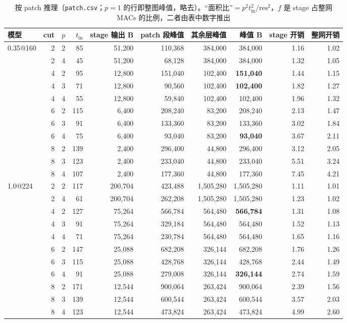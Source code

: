 \documentclass[11pt,a4paper]{ctexart}
\begin{document}
\begin{table}[H]
\centering\small
\caption{按 patch 推理（\texttt{patch.csv}；$p=1$ 的行即整图峰值，略去）。“面积比”$=p^2 t_\text{in}^2/\text{res}^2$，$f$ 是 stage 占整网 MACs 的比例，二者由表中数字推出}\label{tab:patch}
\setlength{\tabcolsep}{4pt}
\begin{tabular}{lrrrrrrrrr}
\toprule
模型 & cut & $p$ & $t_\text{in}$ & stage 输出 B & patch 段峰值 & 其余层峰值 & \textbf{峰值} B & stage 开销 & 整网开销 \\
\midrule
0.35@160 & 2 & 2 & 85 & 51,200 & 110,368 & 384,000 & 384,000 & 1.16 & 1.02 \\
 & 2 & 4 & 45 & 51,200 & 68,128 & 384,000 & 384,000 & 1.32 & 1.05 \\
 & 4 & 2 & 95 & 12,800 & 151,040 & 102,400 & \textbf{151,040} & 1.44 & 1.15 \\
 & 4 & 3 & 71 & 12,800 & 90,560 & 102,400 & \textbf{102,400} & 1.82 & 1.27 \\
 & 4 & 4 & 55 & 12,800 & 59,840 & 102,400 & 102,400 & 1.96 & 1.32 \\
 & 6 & 2 & 115 & 6,400 & 208,240 & 83,200 & 208,240 & 2.13 & 1.47 \\
 & 6 & 3 & 91 & 6,400 & 133,360 & 83,200 & 133,360 & 3.02 & 1.84 \\
 & 6 & 4 & 75 & 6,400 & 93,040 & 83,200 & \textbf{93,040} & 3.67 & 2.11 \\
 & 8 & 2 & 139 & 2,400 & 296,400 & 44,800 & 296,400 & 3.12 & 2.05 \\
 & 8 & 3 & 123 & 2,400 & 233,040 & 44,800 & 233,040 & 5.51 & 3.24 \\
 & 8 & 4 & 107 & 2,400 & 177,360 & 44,800 & 177,360 & 7.45 & 4.21 \\
\midrule
1.0@224 & 2 & 2 & 117 & 200,704 & 423,488 & 1,505,280 & 1,505,280 & 1.11 & 1.01 \\
 & 2 & 4 & 61 & 200,704 & 262,208 & 1,505,280 & 1,505,280 & 1.23 & 1.02 \\
 & 4 & 2 & 127 & 75,264 & 566,784 & 564,480 & \textbf{566,784} & 1.31 & 1.08 \\
 & 4 & 3 & 91 & 75,264 & 329,184 & 564,480 & 564,480 & 1.52 & 1.13 \\
 & 4 & 4 & 71 & 75,264 & 230,784 & 564,480 & 564,480 & 1.65 & 1.16 \\
 & 6 & 2 & 147 & 25,088 & 682,208 & 326,144 & 682,208 & 1.76 & 1.26 \\
 & 6 & 3 & 115 & 25,088 & 428,768 & 326,144 & 428,768 & 2.44 & 1.49 \\
 & 6 & 4 & 91 & 25,088 & 279,008 & 326,144 & \textbf{326,144} & 2.74 & 1.59 \\
 & 8 & 2 & 171 & 12,544 & 900,064 & 263,424 & 900,064 & 2.39 & 1.56 \\
 & 8 & 3 & 139 & 12,544 & 600,544 & 263,424 & 600,544 & 3.57 & 2.03 \\
 & 8 & 4 & 123 & 12,544 & 473,824 & 263,424 & 473,824 & 4.99 & 2.60 \\
\bottomrule
\end{tabular}
\end{table}
\end{document}
